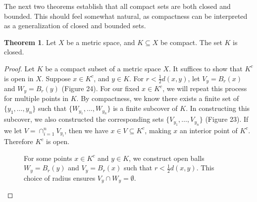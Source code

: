 \documentclass{article}
\theoremstyle{definition}
\newtheorem{theorem}{Theorem}[section]
\begin{document}
	The next two theorems establish that all compact sets are both closed and bounded. This should feel somewhat natural, as compactness can be interpreted as a generalization of closed and bounded sets.
	\begin{theorem}
		Let $ X $ be a metric space, and $ K\subseteq X $ be compact. The set $ K $ is closed. 
	\end{theorem} 
	\begin{proof}
		Let $ K $ be a compact subset of a metric space $ X $. It suffices to show that $ K^c $ is open in $ X $. Suppose $ x\in K^c $, and $ y\in K $. For $ r<\frac{1}{2}d(x,y) $, let $ V_y=B_r(x) $ and $ W_y=B_r(y) $ (Figure 24). For our fixed $ x\in K^c $, we will repeat this process for multiple points in $ K $. By compactness, we know there exists a finite set of $ \{y_1,\ldots,y_n\} $ such that $ \{W_{y_1},\ldots,W_{y_n}\} $ is a finite subcover of $ K $. In constructing this subcover, we also constructed the corresponding sets $ \{V_{y_1},\ldots, V_{y_n}\} $ (Figure 23). If we let $ V=\cap_{i=1}^n V_{y_i} $, then we have $ x\in V\subseteq K^c $, making $ x $ an interior point of $ K^c $. Therefore $ K^c $ is open.
		\begin{figure}[h!]
			\centering
			\caption{For some points $ x\in K^c $ and $ y\in K $, we construct open balls $ W_y=B_r(y)$ and $ V_y=B_r(x) $ such that $ r<\frac{1}{2}d(x,y) $. This choice of radius ensures $ V_y\cap W_y=\emptyset $.}  
		\end{figure}
		\begin{figure}[h!]
			\centering
\end{figure}
\end{proof}
\end{document}
